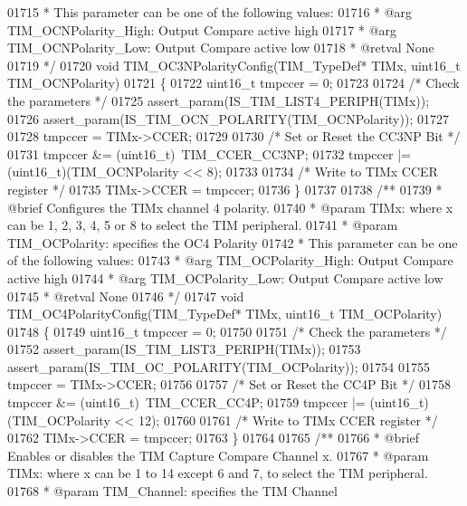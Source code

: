 \begin{DoxyCode}
01715 \textcolor{comment}{  *          This parameter can be one of the following values:}
01716 \textcolor{comment}{  *            @arg TIM\_OCNPolarity\_High: Output Compare active high}
01717 \textcolor{comment}{  *            @arg TIM\_OCNPolarity\_Low: Output Compare active low}
01718 \textcolor{comment}{  * @retval None}
01719 \textcolor{comment}{  */}
01720 \textcolor{keywordtype}{void} TIM_OC3NPolarityConfig(TIM\_TypeDef* TIMx, uint16\_t TIM\_OCNPolarity)
01721 \{
01722   uint16\_t tmpccer = 0;
01723 
01724   \textcolor{comment}{/* Check the parameters */}
01725   assert_param(IS\_TIM\_LIST4\_PERIPH(TIMx));
01726   assert_param(IS\_TIM\_OCN\_POLARITY(TIM\_OCNPolarity));
01727 
01728   tmpccer = TIMx->CCER;
01729 
01730   \textcolor{comment}{/* Set or Reset the CC3NP Bit */}
01731   tmpccer &= (uint16\_t)~TIM_CCER_CC3NP;
01732   tmpccer |= (uint16\_t)(TIM\_OCNPolarity << 8);
01733 
01734   \textcolor{comment}{/* Write to TIMx CCER register */}
01735   TIMx->CCER = tmpccer;
01736 \}
01737 
01738 \textcolor{comment}{/**}
01739 \textcolor{comment}{  * @brief  Configures the TIMx channel 4 polarity.}
01740 \textcolor{comment}{  * @param  TIMx: where x can be 1, 2, 3, 4, 5 or 8 to select the TIM peripheral.}
01741 \textcolor{comment}{  * @param  TIM\_OCPolarity: specifies the OC4 Polarity}
01742 \textcolor{comment}{  *          This parameter can be one of the following values:}
01743 \textcolor{comment}{  *            @arg TIM\_OCPolarity\_High: Output Compare active high}
01744 \textcolor{comment}{  *            @arg TIM\_OCPolarity\_Low: Output Compare active low}
01745 \textcolor{comment}{  * @retval None}
01746 \textcolor{comment}{  */}
01747 \textcolor{keywordtype}{void} TIM_OC4PolarityConfig(TIM\_TypeDef* TIMx, uint16\_t TIM\_OCPolarity)
01748 \{
01749   uint16\_t tmpccer = 0;
01750 
01751   \textcolor{comment}{/* Check the parameters */}
01752   assert_param(IS\_TIM\_LIST3\_PERIPH(TIMx));
01753   assert_param(IS\_TIM\_OC\_POLARITY(TIM\_OCPolarity));
01754 
01755   tmpccer = TIMx->CCER;
01756 
01757   \textcolor{comment}{/* Set or Reset the CC4P Bit */}
01758   tmpccer &= (uint16\_t)~TIM_CCER_CC4P;
01759   tmpccer |= (uint16\_t)(TIM\_OCPolarity << 12);
01760 
01761   \textcolor{comment}{/* Write to TIMx CCER register */}
01762   TIMx->CCER = tmpccer;
01763 \}
01764 
01765 \textcolor{comment}{/**}
01766 \textcolor{comment}{  * @brief  Enables or disables the TIM Capture Compare Channel x.}
01767 \textcolor{comment}{  * @param  TIMx: where x can be 1 to 14 except 6 and 7, to select the TIM peripheral.}
01768 \textcolor{comment}{  * @param  TIM\_Channel: specifies the TIM Channel}

\end{DoxyCode}
